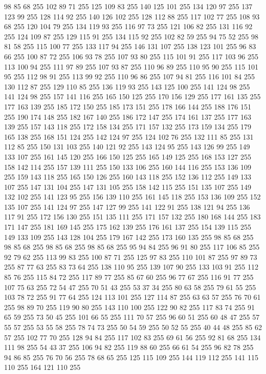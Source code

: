 98 85 68 255 102 89 71 255 125 109 83 255 140 125 101 255 134 120 97 255 137 123 99 255 128 114 92 255 140 126 102 255 128 112 88 255 117 102 77 255 108 93 68 255 120 104 79 255 134 119 93 255 116 97 73 255 121 106 82 255 131 116 92 255 124 109 87 255 129 115 91 255 134 115 92 255 102 82 59 255 94 75 52 255 98 81 58 255 115 100 77 255 133 117 94 255 146 131 107 255 138 123 101 255 96 83 66 255 100 87 72 255 106 93 78 255 107 93 80 255 115 101 91 255 117 103 96 255 113 100 94 255 111 97 89 255 107 93 87 255 110 96 89 255 110 95 90 255 115 101 95 255 112 98 91 255 113 99 92 255 110 96 86 255 107 94 81 255 116 101 84 255 130 112 87 255 129 110 85 255 136 119 93 255 143 125 100 255 141 124 98 255 141 124 98 255 157 141 116 255 165 150 125 255 170 156 129 255 177 161 135 255 177 163 139 255 185 172 150 255 185 173 151 255 178 166 144 255 188 176 151 255 190 174 148 255 182 167 140 255 186 172 147 255 174 161 137 255 177 163 139 255 157 143 118 255
172 158 134 255 171 157 132 255 173 159 134 255 179 165 138 255 168 151 124 255 142 124 97 255 124 102 76 255 132 111 85 255 131 112 85 255 150 131 103 255 140 121 92 255 143 124 95 255 143 126 99 255 149 133 107 255 161 145 120 255 166 150 125 255 165 149 125 255 168 153 127 255 158 142 114 255 157 139 111 255 150 133 106 255 160 144 116 255 153 136 109 255 159 143 118 255 165 150 126 255 160 143 118 255 152 136 112 255 149 133 107 255 147 131 104 255 147 131 105 255 158 142 115 255 151 135 107 255 149 132 102 255 141 123 95 255 156 139 110 255 161 145 118 255 153 136 109 255 152 135 107 255 141 124 97 255 147 127 99 255 141 122 91 255 138 121 94 255 136 117 91 255 172 156 130 255 151 135 111 255 171 157 132 255 180 168 144 255 183 171 147 255 181 169 145 255 175 162 139 255 176 161 137 255 154 139 115 255 149 133 109 255 143 128 104 255 179 167 142 255 173 160 135 255 98 85 68 255 98 85 68 255 98 85 68 255 98 85 68 255 95 94 84 255 96 91 80 255 117 106 85 255 92 79 62 255
113 99 83 255 100 87 71 255 125 97 83 255 110 101 87 255 97 89 73 255 87 77 63 255 83 73 64 255 138 110 95 255 139 107 90 255 133 103 91 255 112 85 76 255 115 84 72 255 117 89 77 255 85 67 60 255 96 77 67 255 116 91 77 255 107 75 63 255 72 54 47 255 70 51 43 255 53 37 34 255 80 63 58 255 79 61 55 255 103 78 72 255 91 77 64 255 124 113 101 255 127 114 87 255 63 63 57 255 76 70 61 255 98 89 70 255 119 90 80 255 143 110 100 255 122 90 82 255 117 83 74 255 91 65 59 255 73 50 45 255 101 66 55 255 111 70 57 255 96 60 51 255 60 48 47 255 57 55 57 255 53 55 58 255 78 74 73 255 50 54 59 255 50 52 55 255 40 44 48 255 85 62 57 255 102 77 70 255 128 94 84 255 117 102 83 255 69 61 56 255 92 81 68 255 134 111 98 255 54 43 37 255 106 94 82 255 119 88 60 255 66 61 54 255 96 82 78 255 94 86 85 255 76 70 56 255 78 68 65 255 125 115 109 255 144 119 112 255 141 115 110 255 164 121 110 255

